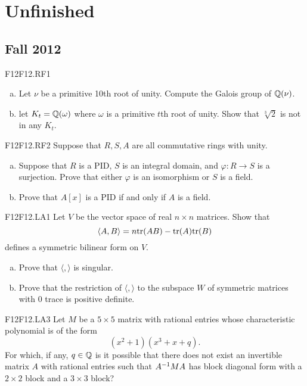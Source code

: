 \documentclass[../AlgebraQualSolutions.tex]{subfiles}
\begin{document}
\section{Unfinished}


	\subsection{Fall 2012}
	
	\begin{prob}{F12}{F12.RF1}
	\begin{enumerate}[(a)]
	\item Let $\nu$ be a primitive 10th root of unity. Compute the Galois group of $\mathbb{Q}(\nu)$.
	\item let $K_t = \mathbb{Q}(\omega)$ where $\omega$ is a primitive $t$th root of unity. Show that $\sqrt[3]{2}$ is not in any $K_t$.
	\end{enumerate}
	\end{prob}
	
	\begin{prob}{F12}{F12.RF2}
	Suppose that $R,S,A$ are all commutative rings with unity.
	\begin{enumerate}[(a)]
	\item Suppose that $R$ is a PID, $S$ is an integral domain, and $\varphi:R \to S$ is a surjection. Prove that either $\varphi$ is an isomorphism or $S$ is a field.
	\item Prove that $A[x]$ is a PID if and only if $A$ is a field.
	\end{enumerate}
	\end{prob}
	
	\begin{prob}{F12}{F12.LA1}
	Let $V$ be the vector space of real $n \times n$ matrices. Show that 	
		\[\langle A, B \rangle = n \mathrm{tr}(AB) - \mathrm{tr}(A)\mathrm{tr}(B) \]
	defines a symmetric bilinear form on $V$.
	\begin{enumerate}[(a)]
	\item Prove that $\langle,\rangle$ is singular.
	\item Prove that the restriction of $\langle,\rangle$ to the subspace $W$ of symmetric matrices with 0 trace is positive definite.
	\end{enumerate}
	\end{prob}

	\begin{prob}{F12}{F12.LA3}
	Let $M$ be a $5 \times 5$ matrix with rational entries whose characteristic polynomial is of the form
		\[(x^2+1)(x^3+x+q).\]
	For which, if any, $q \in \mathbb{Q}$ is it possible that there does not exist an invertible matrix $A$ with rational entries such that $A^{-1} M A$ has block diagonal form with a $2 \times 2$ block and a $3 \times 3$ block?
	\end{prob}
	
\end{document}
